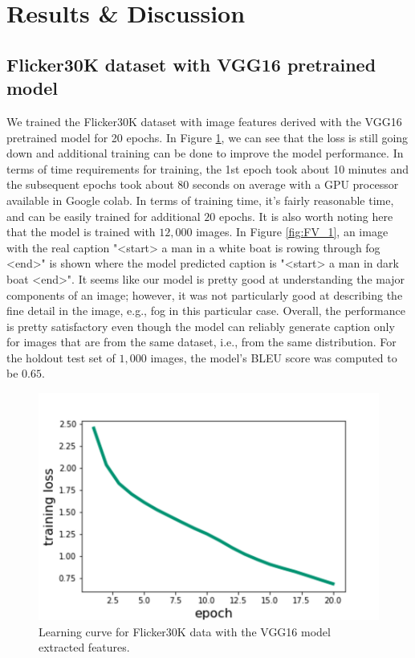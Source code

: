 \documentclass[12pt]{article}
\begin{document}
\section{Results & Discussion}
\label{sec:imfeat}

\subsection{Flicker30K dataset with VGG16 pretrained model}
\label{sec:imfeat}

We trained the Flicker30K dataset with image features derived with the VGG16 pretrained model for 20 epochs. In Figure \ref{fig:FVLR}, we can see that the loss is still going down and additional training can be done to improve the model performance. In terms of time requirements for training, the 1st epoch took about 10 minutes and the subsequent epochs took about 80 seconds on average with a GPU processor available in Google colab. In terms of training time, it's fairly reasonable time, and can be easily trained for additional $20$ epochs. It is also worth noting here that the model is trained with $12,000$ images.
In Figure \ref{fig:FV_1}, an image with the real caption "<start> a man in a white boat is rowing through fog <end>" is shown where the model predicted caption is "<start> a man in dark boat <end>". It seems like our model is pretty good at understanding the major components of an image; however, it was not particularly good at describing the fine detail in the image, e.g., fog in this particular case. Overall, the performance is pretty satisfactory even though the model can reliably generate caption only for images that are from the same dataset, i.e., from the same distribution. For the holdout test set of $1,000$ images, the model's BLEU score was computed to be $0.65$.


\begin{figure}[h!]
\begin{center}
\includegraphics[width=7in]{FVLR.png}
\end{center}
\caption{\label{fig:FVLR}
Learning curve for Flicker30K data with the VGG16 model extracted features.}
\end{figure}
\end{document}
